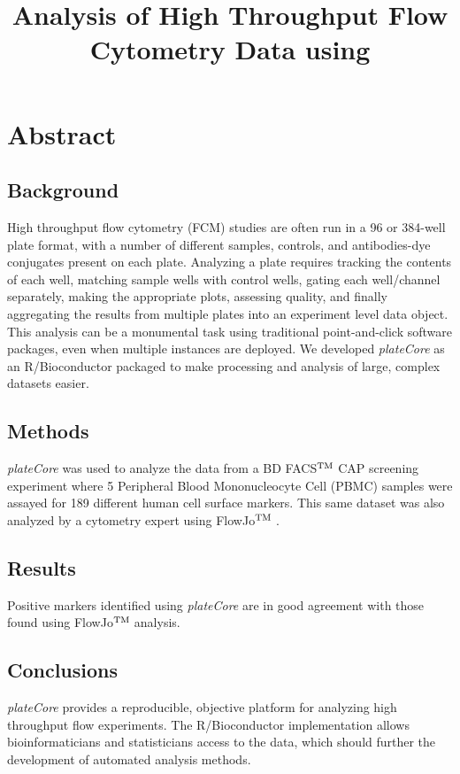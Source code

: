 \documentclass[12pt]{article}
\title{Analysis of High Throughput Flow Cytometry Data using \Rpackage{plateCore}}
\newcommand{\Rpackage}[1]{{\textit{#1}}}
\def\tm{$^{\rm \text{TM }}$}
\begin{document}
\maketitle

\clearpage
\section*{Abstract}
\subsection*{Background}
High throughput flow cytometry (FCM) studies are often run in a 96 or 384-well plate format, with a number of different samples, 
controls, and antibodies-dye conjugates present on each plate. 
Analyzing a plate requires tracking the contents
of each well, matching sample wells with control wells, gating each well/channel separately, making the appropriate plots,
assessing quality, and finally aggregating the results from multiple plates into an experiment level data object. 
This analysis can be a monumental task using traditional point-and-click software packages, even when multiple instances are
deployed. We developed \Rpackage{plateCore} as an R/Bioconductor packaged to make processing and analysis of
large, complex datasets easier. 

\subsection*{Methods}
\Rpackage{plateCore} was used to analyze the data from a BD FACS\tm CAP screening experiment where 5
Peripheral Blood Mononucleocyte Cell (PBMC) samples 
were assayed for 189 different human cell surface markers. 
This same dataset was also analyzed by a cytometry expert using FlowJo\tm.

\subsection*{Results}
Positive markers identified using \Rpackage{plateCore} are in good agreement with those found using FlowJo\tm analysis.

\subsection*{Conclusions}
\Rpackage{plateCore} provides a reproducible, objective platform for analyzing high throughput flow experiments. The R/Bioconductor 
implementation allows bioinformaticians and statisticians access to the data, which should further the development of automated
analysis methods.
\end{document}
